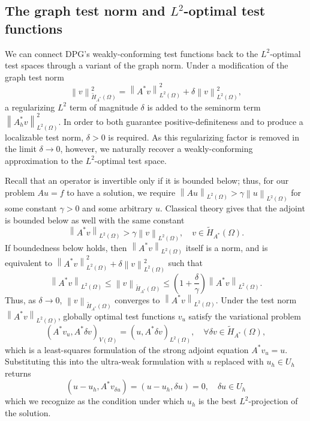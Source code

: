 \documentclass[11pt,onecolumn]{scrartcl}
\newcommand{\nor}[1]{\left\| #1 \right\|}
\newcommand{\LRp}[1]{\left( #1 \right)}
\renewcommand{\L}{L^2\LRp{\Omega}}
\begin{document}
\subsection{The graph test norm and $L^2$-optimal test functions}

We can connect DPG's weakly-conforming test functions back to the $L^2$-optimal test spaces through a variant of the graph norm.  Under a modification of the graph test norm
\[
\nor{v}_{\tilde{H}_{A^*}(\Omega)}^2 = \nor{A^*v}_{\L}^2 + \delta \nor{v}_{\L}^2,
\]
a regularizing $L^2$ term of magnitude $\delta$ is added to the seminorm term $\nor{A_h^*v}_{\L}^2$.  In order to both guarantee positive-definiteness and to produce a localizable test norm, $\delta > 0$ is required.  As this regularizing factor is removed in the limit $\delta \rightarrow 0$, however, we naturally recover a weakly-conforming approximation to the $L^2$-optimal test space.  

Recall that an operator is invertible only if it is bounded below; thus, for our problem $Au=f$ to have a solution, we require $\nor{Au}_{\L} > \gamma\nor{u}_{\L}$ for some constant $\gamma > 0$ and some arbitrary $u$.  Classical theory gives that the adjoint is bounded below as well with the same constant
\[
\nor{A^*v}_{\L} > \gamma\nor{v}_{\L}, \quad v\in \tilde{H}_{A^*}(\Omega).
\]
If boundedness below holds, then $\nor{A^*v}_{\L}$ itself is a norm, and is equivalent to $\nor{A^*v}_{\L}^2 + \delta \nor{v}_{\L}^2$ such that
\[
\nor{A^*v}_{\L} \leq \nor{v}_{\tilde{H}_{A^*}(\Omega)} \leq \LRp{1+\frac{\delta}{\gamma}}\nor{A^*v}_{\L}.
\]
Thus, as $\delta \rightarrow 0$, $\nor{v}_{\tilde{H}_{A^*}(\Omega)}$ converges to $\nor{A^*v}_{\L}$.  Under the test norm $\nor{A^*v}_{\L}$, globally optimal test functions $v_u$ satisfy the variational problem
\[
\LRp{A^* v_u, A^* \delta v}_{V(\Omega)} = \LRp{u,A^* \delta v}_{L^2(\Omega)}, \quad \forall \delta v \in \tilde{H}_{A^*}(\Omega),
\]
which is a least-squares formulation of the strong adjoint equation $A^* v_u = u$.  Substituting this into the ultra-weak formulation with $u$ replaced with $u_h\in U_h$ returns
\[
\LRp{u-u_h,A^*v_{\delta u}} = \LRp{u-u_h,\delta u} = 0, \quad \delta u \in U_h
\]
which we recognize as the condition under which $u_h$ is the best $L^2$-projection of the solution.  
\end{document}
